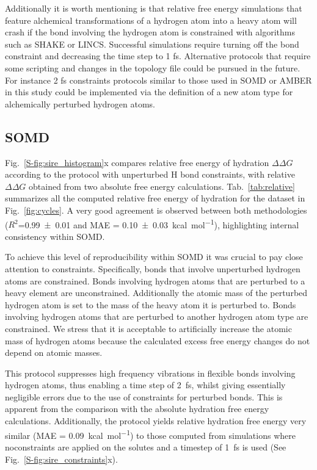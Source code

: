 \documentclass[journal=jctcce,manuscript=article]{achemso}
\begin{document}
Additionally it is worth mentioning is that relative free energy
simulations that feature alchemical transformations of a hydrogen atom
into a heavy atom will crash if the bond involving the hydrogen atom
is constrained with algorithms such as SHAKE or LINCS.  Successful
simulations require turning off the bond constraint and decreasing the
time step to 1 fs. Alternative protocols that require some scripting
and changes in the topology file could be pursued in the future. For
instance 2 fs constraints protocols similar to those used in SOMD or
AMBER in this study could be implemented via the definition of a new
atom type for alchemically perturbed hydrogen atoms.


\subsection{SOMD}
\label{sec:somd-results}

Fig.~\ref{S-fig:sire_histogram}x compares relative free energy of hydration
$\Delta\Delta G$ according to the protocol with unperturbed H bond constraints, with relative
$\Delta \Delta G$ obtained from two absolute free energy calculations.
Tab.~\ref{tab:relative} summarizes all the computed relative free energy of
hydration for the dataset in Fig.~\ref{fig:cycles}.
A very good agreement is observed between both methodologies
($R^2$=\SI{0.99+-0.01}{} and MAE = \SI{0.10+-0.03}{kcal.mol^{-1}}),
highlighting internal consistency within SOMD.

To achieve this level of reproducibility within SOMD it was crucial to pay close attention to constraints. Specifically, bonds that involve unperturbed hydrogen atoms are constrained. Bonds involving hydrogen atoms that are perturbed to a heavy element are unconstrained.  Additionally the atomic mass of the perturbed hydrogen atom is set to the mass of the heavy atom it is
perturbed to.  Bonds involving hydrogen atoms that are perturbed to another hydrogen atom type are constrained. We stress that it is acceptable to artificially increase the atomic mass of hydrogen atoms because the calculated excess free energy changes do not depend on atomic masses.

This protocol suppresses high frequency vibrations in flexible bonds involving hydrogen atoms, thus enabling a time
step of \SI{2}{fs}, whilst giving essentially negligible errors due to the use of constraints for perturbed bonds.  This is apparent from the comparison with the absolute hydration free energy calculations.  Additionally, the protocol
yields relative hydration free energy very similar  (MAE =
\SI{0.09}{kcal.mol^{-1}}) to those computed from simulations where noconstraints are applied on the solutes and a timestep of \SI{1}{fs} is used (See Fig.~\ref{S-fig:sire_constraints}x).
\end{document}
